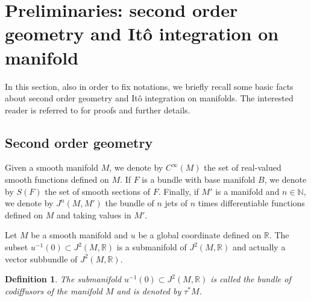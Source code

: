 \documentclass{article}[10pt]
\newtheorem{definition}[theorem]{Definition}
\newcommand{\cinf}[0]{C^{\infty}}
\begin{document}
\section{Preliminaries: second order geometry and It\^o integration on manifold}\label{section_preliminaries}

In this section, also in order to fix notations, we briefly recall some basic facts about second order geometry and  It\^o integration on
manifolds. The interested reader is referred to  \cite{Emery1989,Meyer1981,Schwartz1982} for proofs and further details.

\subsection{Second order geometry}

Given a smooth manifold $M$, we denote by $ \cinf (M) $ the set of
real-valued smooth functions defined on $ M $. If $ F $ is a
bundle with base manifold  $ B $, we denote by $ S(F) $ the set of smooth
sections of $ F $.
Finally, if $ M '$ is a manifold and $ n \in \mathbb{N} $, we
denote by $ J^n(M, M') $ the bundle of $ n $ jets of $ n $ times
differentiable functions defined on $ M $ and taking values in $ M
'$.

Let  $ M $ be a  smooth manifold and $u$ be a global coordinate defined on
$\mathbb{R}$. The subset $ u^{- 1} (0) \subset J ^ 2
(M, \mathbb {R}) $ is a submanifold of $ J^2 (M, \mathbb{R})$ and actually a vector subbundle of $ J^2 (M, \mathbb{R})$.

\begin{definition}
The submanifold $ u^{- 1} (0) \subset J ^ 2 (M, \mathbb {R}) $ is
called the \emph{bundle of codiffusors} of the manifold $ M $ and
is denoted by $ \tau^* M $.
\end{definition}
\end{document}
